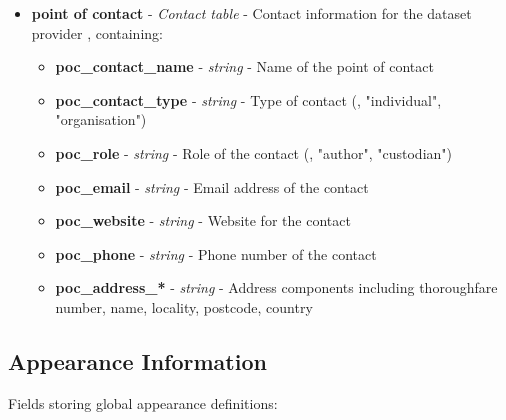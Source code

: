 \begin{itemize}
  \item \textbf{point of contact} - \textit{Contact table} - Contact information for the dataset provider \citep{cityjson_spec}, containing:
    \begin{itemize}
      \item \textbf{poc\_contact\_name} - \textit{string} - Name of the point of contact
      \item \textbf{poc\_contact\_type} - \textit{string} - Type of contact (\eg, "individual", "organisation")
      \item \textbf{poc\_role} - \textit{string} - Role of the contact (\eg, "author", "custodian")
      \item \textbf{poc\_email} - \textit{string} - Email address of the contact
      \item \textbf{poc\_website} - \textit{string} - Website for the contact
      \item \textbf{poc\_phone} - \textit{string} - Phone number of the contact
      \item \textbf{poc\_address\_*} - \textit{string} - Address components including thoroughfare number, name, locality, postcode, country
    \end{itemize}
\end{itemize}

\subsection{Appearance Information}
\label{methodology:header:appearance}

Fields storing global appearance definitions:

